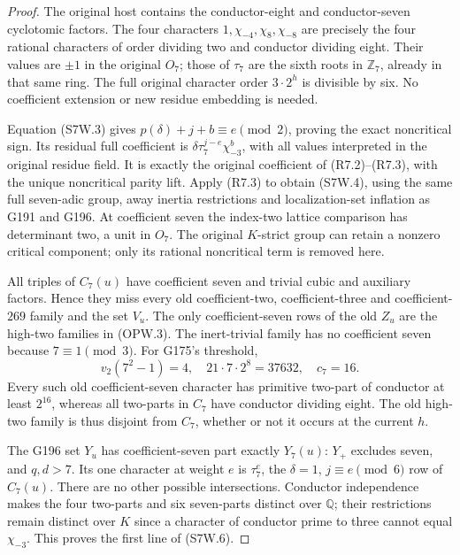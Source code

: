 \begin{proof}
The original host contains the conductor-eight and conductor-seven
cyclotomic factors. The four characters
$1,\chi_{-4},\chi_8,\chi_{-8}$ are precisely the four rational
characters of order dividing two and conductor dividing eight. Their values
are $\pm1$ in the original $O_7$; those of $\tau_7$ are the
sixth roots in $\mathbb Z_7$, already in that same ring.
The full original character order $3\cdot2^h$ is divisible by six.
No coefficient extension or new residue embedding is needed.

Equation (S7W.3) gives
$p(\delta)+j+b\equiv e\pmod2$, proving the exact noncritical
sign. Its residual full coefficient is
$\delta\tau_7^{j-e}\chi_{-3}^{b}$, with all values interpreted
in the original residue field. It is exactly the original coefficient
of (R7.2)--(R7.3), with the unique noncritical parity lift.
Apply (R7.3) to obtain (S7W.4), using the same full seven-adic group,
away inertia restrictions and localization-set inflation as
G191 and G196. At coefficient seven the index-two lattice
comparison has determinant two, a unit in $O_7$.
The original $K$-strict group can retain a nonzero critical
component; only its rational noncritical term is removed here.

All triples of $C_7(u)$ have coefficient seven and trivial cubic
and auxiliary factors. Hence they miss every old coefficient-two,
coefficient-three and coefficient-$269$ family and the set $V_u$.
The only coefficient-seven rows of the old $Z_u$ are the high-two
families in (OPW.3). The inert-trivial family has no coefficient
seven because $7\equiv1\pmod3$. For G175's threshold,
\[
 v_2(7^2-1)=4,\quad21\cdot7\cdot2^8=37632,\quad c_7=16.
 \tag{S7W.9}
\]
Every such old coefficient-seven character has primitive two-part
of conductor at least $2^{16}$, whereas all two-parts in $C_7$
have conductor dividing eight. The old high-two family is thus
disjoint from $C_7$, whether or not it occurs at the current $h$.

The G196 set $Y_u$ has coefficient-seven part exactly $Y_7(u)$:
$Y_+$ excludes seven, and $q,d>7$. Its one character at weight
$e$ is $\tau_7^e$, the $\delta=1$, $j\equiv e\pmod6$ row of
$C_7(u)$. There are no other possible intersections.
Conductor independence makes the four two-parts and six seven-parts
distinct over $\mathbb Q$; their restrictions remain distinct over
$K$ since a character of conductor prime to three cannot equal
$\chi_{-3}$. This proves the first line of (S7W.6).


\end{proof}
